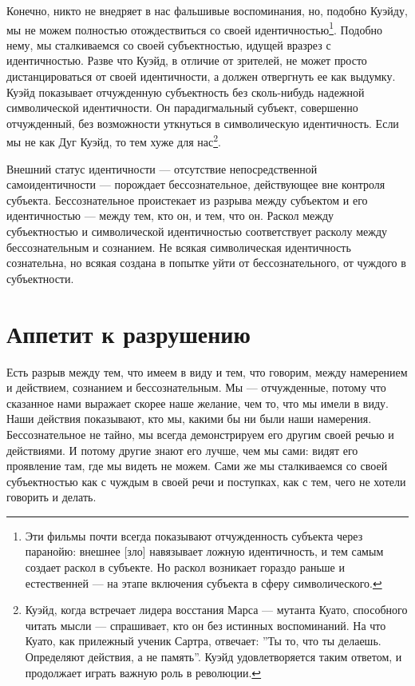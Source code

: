 \documentclass[12pt]{book}
\begin{document}
Конечно, никто не внедряет в нас фальшивые воспоминания, но, подобно Куэйду, мы не можем полностью отождествиться со своей идентичностью\footnote{Эти фильмы почти всегда показывают отчужденность субъекта через паранойю: внешнее [зло] навязывает ложную идентичность, и тем самым создает раскол в субъекте. Но раскол возникает гораздо раньше и естественней --- на этапе включения субъекта в сферу символического.}. Подобно нему, мы сталкиваемся со своей субъектностью, идущей вразрез с идентичностью. Разве что Куэйд, в отличие от зрителей, не может просто дистанцироваться от своей идентичности, а должен отвергнуть ее как выдумку. Куэйд показывает отчужденную субъектность без сколь-нибудь надежной символической идентичности. Он парадигмальный субъект, совершенно отчужденный, без возможности уткнуться в символическую идентичность. Если мы не как Дуг Куэйд, то тем хуже для нас\footnote{Куэйд, когда встречает лидера восстания Марса --- мутанта Куато, способного читать мысли --- спрашивает, кто он без истинных воспоминаний. На что Куато, как прилежный ученик Сартра, отвечает: ''Ты то, что ты делаешь. Определяют действия, а не память''. Куэйд удовлетворяется таким ответом, и продолжает играть важную роль в революции.}.

Внешний статус идентичности --- отсутствие непосредственной самоидентичности --- порождает бессознательное, действующее вне контроля субъекта. Бессознательное проистекает из разрыва между субъектом и его идентичностью --- между тем, кто он, и тем, что он. Раскол между субъектностью и символической идентичностью соответствует расколу между бессознательным и сознанием. Не всякая символическая идентичность сознательна, но всякая создана в попытке уйти от бессознательного, от чуждого в субъектности.

\section{Аппетит к разрушению}

Есть разрыв между тем, что имеем в виду и тем, что говорим, между намерением и действием, сознанием и бессознательным. Мы --- отчужденные, потому что сказанное нами выражает скорее наше желание, чем то, что мы имели в виду. Наши действия показывают, кто мы, какими бы ни были наши намерения. Бессознательное не тайно, мы всегда демонстрируем его другим своей речью и действиями. И потому другие знают его лучше, чем мы сами: видят его проявление там, где мы видеть не можем. Сами же мы сталкиваемся со своей субъектностью как с чуждым в своей речи и поступках, как с тем, чего не хотели говорить и делать.
\end{document}
